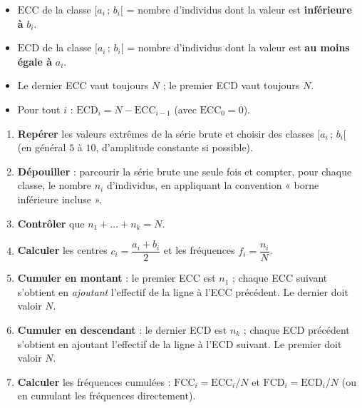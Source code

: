 \documentclass[11pt]{article}
\begin{document}
\begin{aretenir}
\begin{itemize}
\item $\text{ECC}$ de la classe $[a_i\,;\,b_i[$ = nombre d'individus dont la valeur est \textbf{inférieure à} $b_i$.
\item $\text{ECD}$ de la classe $[a_i\,;\,b_i[$ = nombre d'individus dont la valeur est \textbf{au moins égale à} $a_i$.
\item Le dernier ECC vaut toujours $N$ ; le premier ECD vaut toujours $N$.
\item Pour tout $i$ : $\text{ECD}_i = N - \text{ECC}_{i-1}$ (avec $\text{ECC}_0 = 0$).
\end{itemize}
\end{aretenir}

\begin{methode}
\begin{enumerate}
\item \textbf{Repérer} les valeurs extrêmes de la série brute et choisir des classes $[a_i\,;\,b_i[$ (en général $5$ à $10$, d'amplitude constante si possible).
\item \textbf{Dépouiller} : parcourir la série brute une seule fois et compter, pour chaque classe, le nombre $n_i$ d'individus, en appliquant la convention « borne inférieure incluse ».
\item \textbf{Contrôler} que $n_1 + \dots + n_k = N$.
\item \textbf{Calculer} les centres $c_i = \dfrac{a_i+b_i}{2}$ et les fréquences $f_i = \dfrac{n_i}{N}$.
\item \textbf{Cumuler en montant} : le premier ECC est $n_1$ ; chaque ECC suivant s'obtient en \emph{ajoutant} l'effectif de la ligne à l'ECC précédent. Le dernier doit valoir $N$.
\item \textbf{Cumuler en descendant} : le dernier ECD est $n_k$ ; chaque ECD précédent s'obtient en ajoutant l'effectif de la ligne à l'ECD suivant. Le premier doit valoir $N$.
\item \textbf{Calculer} les fréquences cumulées : $\text{FCC}_i = \text{ECC}_i / N$ et $\text{FCD}_i = \text{ECD}_i / N$ (ou en cumulant les fréquences directement).
\end{enumerate}
\end{methode}
\end{document}
